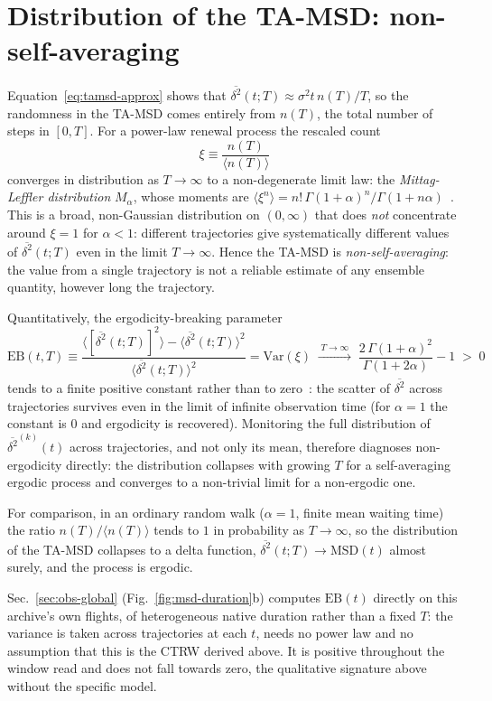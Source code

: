 \section*{Distribution of the TA-MSD: non-self-averaging}

Equation~\eqref{eq:tamsd-approx} shows that $\overline{\delta^2}(t;T)\approx\sigma^2 t\,
n(T)/T$, so the randomness in the TA-MSD comes entirely from $n(T)$, the total number of
steps in $[0,T]$. For a power-law renewal process the rescaled count
\begin{equation}
  \xi\equiv\frac{n(T)}{\langle n(T)\rangle}
\end{equation}
converges in distribution as $T\to\infty$ to a non-degenerate limit law: the
\emph{Mittag-Leffler distribution} $M_\alpha$, whose moments are
$\langle\xi^n\rangle=n!\,\Gamma(1+\alpha)^n/\Gamma(1+n\alpha)$~\cite{he2008}.
This is a broad, non-Gaussian distribution on $(0,\infty)$ that does \emph{not} concentrate
around $\xi=1$ for $\alpha<1$: different trajectories give systematically different values
of $\overline{\delta^2}(t;T)$ even in the limit $T\to\infty$. Hence the TA-MSD is
\emph{non-self-averaging}: the value from a single trajectory is not a reliable estimate
of any ensemble quantity, however long the trajectory.

Quantitatively, the ergodicity-breaking parameter
\begin{equation}
  \mathrm{EB}(t,T)\equiv
  \frac{\langle[\overline{\delta^2}(t;T)]^2\rangle-\langle\overline{\delta^2}(t;T)\rangle^2}
       {\langle\overline{\delta^2}(t;T)\rangle^2}
  =\mathrm{Var}(\xi)\;\xrightarrow{\;T\to\infty\;}\;
  \frac{2\,\Gamma(1+\alpha)^2}{\Gamma(1+2\alpha)}-1\;>\;0
\end{equation}
tends to a finite positive constant rather than to zero~\cite{he2008}: the scatter of
$\overline{\delta^2}$ across trajectories survives even in the limit of infinite
observation time (for $\alpha=1$ the constant is $0$ and ergodicity is recovered).
Monitoring the full distribution of $\overline{\delta^2}^{(k)}(t)$ across trajectories,
and not only its mean, therefore diagnoses non-ergodicity directly: the distribution
collapses with growing $T$ for a self-averaging ergodic process and converges to a
non-trivial limit for a non-ergodic one.

For comparison, in an ordinary random walk ($\alpha=1$, finite mean waiting time) the ratio
$n(T)/\langle n(T)\rangle$ tends to $1$ in probability as $T\to\infty$, so the distribution
of the TA-MSD collapses to a delta function, $\overline{\delta^2}(t;T)\to\mathrm{MSD}(t)$
almost surely, and the process is ergodic.

Sec.~\ref{sec:obs-global} (Fig.~\ref{fig:msd-duration}b) computes $\mathrm{EB}(t)$ directly
on this archive's own flights, of heterogeneous native duration rather than a fixed $T$: the
variance is taken across trajectories at each $t$, needs no power law and no assumption that
this is the CTRW derived above. It is positive throughout the window read and does not fall
towards zero, the qualitative signature above without the specific model.
